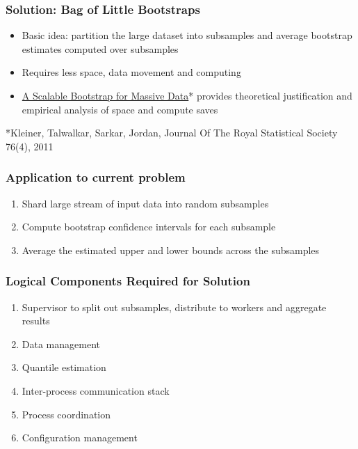 \documentclass[14pt,mathserif]{beamer}
\begin{document}
\begin{frame}
  \frametitle{Solution: Bag of Little Bootstraps}
  \begin{itemize}
  \item Basic idea: partition the large dataset into subsamples and average bootstrap estimates
        computed over subsamples
  \item Requires less space, data movement and computing 
  \item \textcolor{blue}
      {\href{https://arxiv.org/pdf/1112.5016.pdf}{A Scalable Bootstrap for Massive Data}}*
      provides theoretical justification and empirical analysis of space and compute saves
  \end{itemize}
  \begin{small}
  *Kleiner, Talwalkar, Sarkar, Jordan, Journal Of The Royal Statistical Society 76(4), 2011
  \end{small}
\end{frame} 

\begin{frame}
  \frametitle{Application to current problem}
  \begin{enumerate}
  \item Shard large stream of input data into random subsamples
  \item Compute bootstrap confidence intervals for each subsample
  \item Average the estimated upper and lower bounds across the subsamples
  \end{enumerate}
 \end{frame}
  
\begin{frame}
  \frametitle{Logical Components Required for Solution}
  \begin{enumerate}
  \item Supervisor to split out subsamples, distribute to workers and aggregate results
  \item Data management 
  \item Quantile estimation
  \item Inter-process communication stack
  \item Process coordination
  \item Configuration management
  \end{enumerate}
\end{frame}
  
\end{document}
